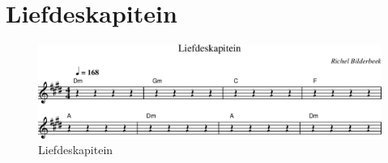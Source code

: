\chapter{Liefdeskapitein}



\begin{figure}[!htbp]
  \includegraphics[width=\textwidth,height=\textheight,keepaspectratio]{../songs/60_liefdeskapitein.png}
  \caption{Liefdeskapitein}
  \label{fig:60_liefdeskapitein}
\end{figure}
